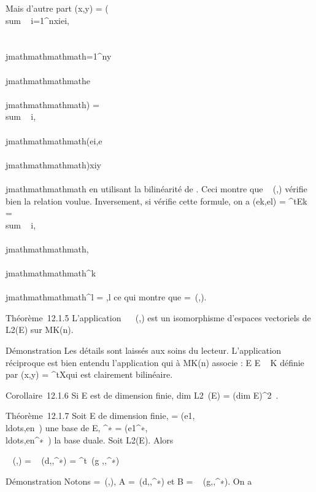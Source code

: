 Mais d'autre part \phi(x,y) =
\phi(\\sum ~
i=1^nxiei,\\\sum
 \\\\jmathmathmathmath=1^ny\\\\jmathmathmathmathe\\\\jmathmathmathmath)
= \\sum ~
i,\\\\jmathmathmathmath\phi(ei,e\\\\jmathmathmathmath)xiy\\\\jmathmathmathmath en
utilisant la bilinéarité de \phi. Ceci montre que
\mathrmMat~ (\phi,) vérifie
bien la relation voulue. Inversement, si \Omega vérifie cette formule, on a
\phi(ek,el) = ^tEk\OmegaEl
= \\sum ~
i,\\\\jmathmathmathmath\omegai,\\\\jmathmathmathmath\deltai^k\delta\\\\jmathmathmathmath^l =
\omegak,l ce qui montre que \Omega =\
\mathrmMat (\phi,).

Théorème~12.1.5 L'application
\phi\mapsto~\mathrmMat~
(\phi,) est un isomorphisme d'espaces vectoriels de L2(E) sur
MK(n).

Démonstration Les détails sont laissés aux soins du lecteur.
L'application réciproque est bien entendu l'application qui à \Omega \in
MK(n) associe \phi : E \times E \rightarrow~ K définie par \phi(x,y) =
^tX\OmegaY qui est clairement bilinéaire.

Corollaire~12.1.6 Si E est de dimension finie,
dim L2~(E) =
(dim E)^2~.

Théorème~12.1.7 Soit E de dimension finie,  =
(e1,\\ldots,en~)
une base de E, ^∗ =
(e1^∗,\\ldots,en^∗~)
la base duale. Soit \phi \in L2(E). Alors

\mathrmMat~ (\phi,)
= \mathrmMat~
(d\phi,,^∗) = ^t\
\mathrmMat (g \phi,,^∗)

Démonstration Notons \Omega =\
\mathrmMat (\phi,), A =\
\mathrmMat (d\phi,,^∗) et B
= \mathrmMat~
(g\phi,\mathcal{E},\mathcal{E}^∗). On a

